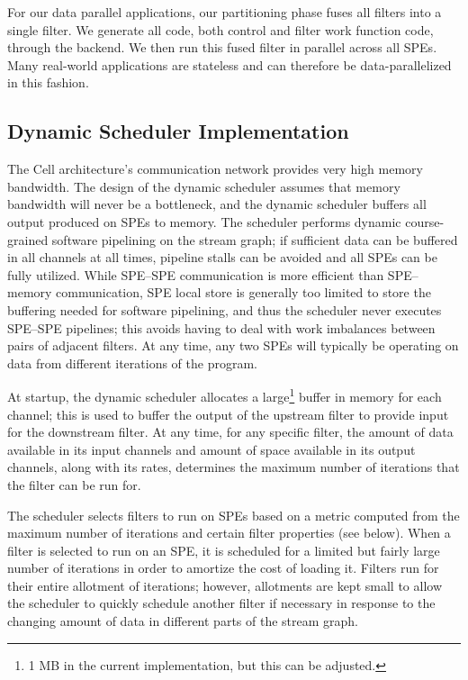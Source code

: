 For our data parallel applications, our partitioning
phase fuses all filters into a single filter. We generate all code, both control and
filter work function code, through the backend. We then run this fused filter
in parallel across all SPEs. Many real-world applications are stateless and can
therefore be data-parallelized in this fashion.



\subsection{Dynamic Scheduler Implementation}\label{ch:ds:imp}

The Cell architecture's communication network provides very high
memory bandwidth. The design of the dynamic scheduler assumes that
memory bandwidth will never be a bottleneck, and the dynamic scheduler
buffers all output produced on SPEs to memory. The scheduler performs
dynamic course-grained software pipelining on the stream graph; if
sufficient data can be buffered in all channels at all times, pipeline
stalls can be avoided and all SPEs can be fully utilized. While
SPE--SPE communication is more efficient than SPE--memory
communication, SPE local store is generally too limited to store the
buffering needed for software pipelining, and thus the scheduler never
executes SPE--SPE pipelines; this avoids having to deal with work
imbalances between pairs of adjacent filters. At any time, any two
SPEs will typically be operating on data from different 
iterations of the program.

At startup, the dynamic scheduler allocates a large\footnote{1 MB in
the current implementation, but this can be adjusted.} buffer in
memory for each channel; this is used to buffer the output of the
upstream filter to provide input for the downstream filter. At any
time, for any specific filter, the amount of data available in its
input channels and amount of space available in its output channels,
along with its rates, determines the maximum number of iterations that
the filter can be run for.

The scheduler selects filters to run on SPEs based on a metric
computed from the maximum number of iterations and certain filter
properties (see below). When a filter is selected to run on an SPE, it
is scheduled for a limited but fairly large number of iterations in
order to amortize the cost of loading it. Filters run for their entire
allotment of iterations; however, allotments are kept small to allow
the scheduler to quickly schedule another filter if necessary in
response to the changing amount of data in different parts of the stream graph.

